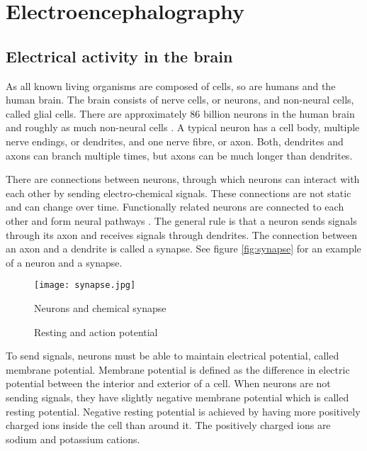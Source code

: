 
\chapter{Electroencephalography}
\section{Electrical activity in the brain}
\label{sec:neuron}

As all known living organisms are composed of cells, so are humans and the human brain. The brain consists of nerve cells, or neurons, and non-neural cells, called glial cells. There are approximately 86 billion neurons in the human brain and roughly as much non-neural cells \cite{neuroncount}. A typical neuron has a cell body, multiple nerve endings, or dendrites, and one nerve fibre, or axon. Both, dendrites and axons can branch multiple times, but axons can be much longer than dendrites. 

There are connections between neurons, through which neurons can interact with each other by sending electro-chemical signals. These connections are not static and can change over time. Functionally related neurons are connected to each other and form neural pathways \cite{neuralpathway}. The general rule is that a neuron sends signals through its axon and receives signals through dendrites. The connection between an axon and a dendrite is called a synapse. See figure \ref{fig:synapse} for an example of a neuron and a synapse.

\begin{figure}[b!]
	\begin{minipage}{0.5\textwidth}
		\centering
		\texttt{[image: synapse.jpg]}
		\caption{Neurons and chemical synapse \cite[p.~17]{neuronpic}}
		\label{fig:synapse}
	\end{minipage}
	\begin{minipage}{0.5\textwidth}
		\centering
		\caption{Resting and action potential}
		\label{fig:action_potential}
	\end{minipage}
\end{figure}

To send signals, neurons must be able to maintain electrical potential, called membrane potential. Membrane potential is defined as the difference in electric potential between the interior and exterior of a cell. When neurons are not sending signals, they have slightly negative membrane potential which is called resting potential. Negative resting potential is achieved by having more positively charged ions inside the cell than around it. The positively charged ions are sodium and potassium cations.

